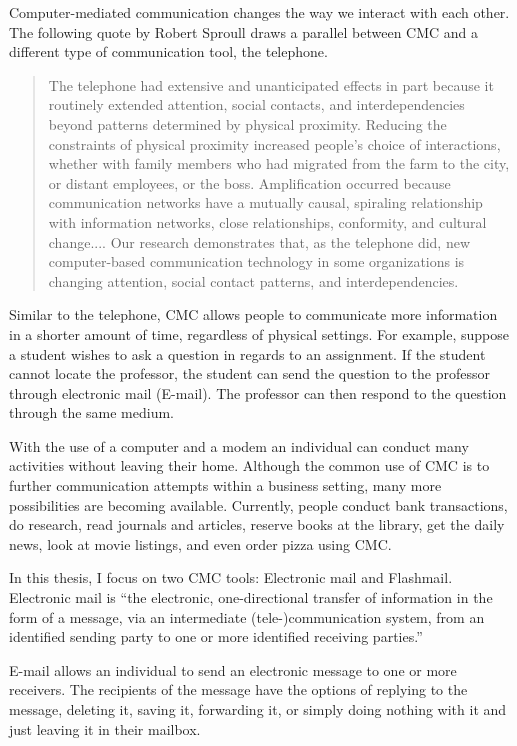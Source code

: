 Computer-mediated communication changes the way we interact with each
other.  The following quote by Robert Sproull draws a parallel between CMC
and a different type of communication tool, the telephone.

\begin{quote}
  The telephone had extensive and unanticipated effects in part because it
  routinely extended attention, social contacts, and interdependencies
  beyond patterns determined by physical proximity. Reducing the
  constraints of physical proximity increased people's choice of
  interactions, whether with family members who had migrated from the farm
  to the city, or distant employees, or the boss. Amplification occurred
  because communication networks have a mutually causal, spiraling
  relationship with information networks, close relationships, conformity,
  and cultural change.... Our research demonstrates that, as the telephone
  did, new computer-based communication technology in some organizations is
  changing attention, social contact patterns, and interdependencies.
  \cite{Sproull93}
\end{quote}

Similar to the telephone, CMC allows people to communicate more information
in a shorter amount of time, regardless of physical settings.  For example,
suppose a student wishes to ask a question in regards to an assignment.  If
the student cannot locate the professor, the student can send the question
to the professor through electronic mail (E-mail).  The professor can then
respond to the question through the same medium.

With the use of a computer and a modem an individual can conduct many
activities without leaving their home.  Although the common use of CMC is
to further communication attempts within a business setting, many more
possibilities are becoming available.  Currently, people conduct bank
transactions, do research, read journals and articles, reserve books at the
library, get the daily news, look at movie listings, and even order pizza
using CMC. 

In this thesis, I focus on two CMC tools: Electronic mail and Flashmail.
Electronic mail is ``the electronic, one-directional transfer of
information in the form of a message, via an intermediate
(tele-)communication system, from an identified sending party to one or
more identified receiving parties.''  \cite{Vervest85}

E-mail allows an individual to send an electronic message to one or more
receivers.  The recipients of the message have the options of replying to
the message, deleting it, saving it, forwarding it, or simply doing nothing
with it and just leaving it in their mailbox.

